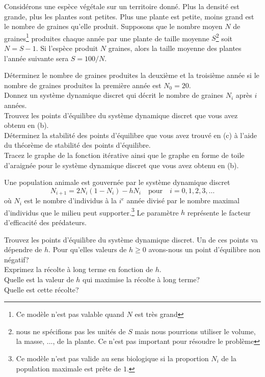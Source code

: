 \begin{question}[\life]
Considérons une espèce végétale sur un territoire donné.  Plus la densité
est grande, plus les plantes sont petites.  Plus une plante est petite,
moins grand est le nombre de graines qu'elle produit.  Supposons que le
nombre moyen $N$ de graines\footnote{Ce modèle n'est pas valable quand
$N$ est très grand} produites chaque année par une plante de
taille moyenne $S$\footnote{nous ne spécifions pas les unités de $S$ mais
nous pourrions utiliser le volume, la masse, ..., de la plante.  Ce
n'est pas important pour résoudre le problème} soit
$N=S-1$.  Si l'espèce produit $N$ graines, alors la taille moyenne
des plantes l'année suivante sera $S = 100/N$.

 Déterminez le nombre de graines produites la deuxième et la troisième
année si le nombre de graines produites la première année est $N_0 = 20$.\\
 Donnez un système dynamique discret qui décrit le nombre de graines
$N_i$ après $i$ années.\\
 Trouvez les points d'équilibre du système dynamique discret que vous
avez obtenu en (b).\\
 Déterminez la stabilité des points d'équilibre que vous avez trouvé en
(c) à l'aide du théorème de stabilité des points d'équilibre.\\
 Tracez le graphe de la fonction itérative ainsi que le graphe en
forme de toile d'araignée pour le système dynamique discret que vous
avez obtenu en (b).
\label{6Q114}
\end{question}

\begin{question}[\life]
Une population animale est gouvernée par le système dynamique discret  
\[
N_{i+1} = 2 N_i (1-N_i) - h N_i \quad \text{pour} \quad i=0, 1, 2, 3,\ldots
\]
où $N_i$ est le nombre d'individus à la $i^e$ année divisé par le nombre
maximal d'individus que le milieu peut supporter.\footnote{Ce modèle
n'est pas valide au sens biologique si la proportion $N_i$ de la
population maximale est prête de $1$.}  Le paramètre $h$ représente le
facteur d'efficacité des prédateurs.

 Trouvez les points d'équilibre du système dynamique discret.  Un de
ces points va dépendre de $h$.  Pour qu'elles valeurs de $h \geq 0$
avons-nous un point d'équilibre non négatif?\\
 Exprimez la récolte à long terme en fonction de $h$.\\
 Quelle est la valeur de $h$ qui maximise la récolte à long terme?\\
 Quelle est cette récolte?
\label{6Q115}
\end{question}

